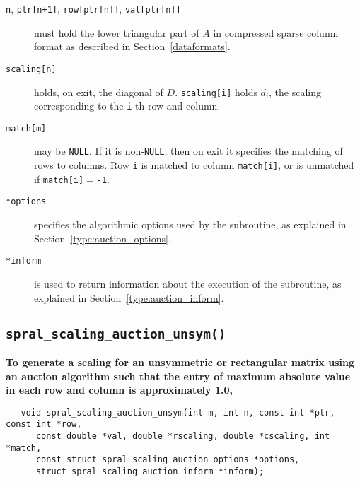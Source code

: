 \begin{description}

\item[\texttt{n}, \texttt{ptr[n+1]}, \texttt{row[ptr[n]]}, \texttt{val[ptr[n]]}] must hold the lower triangular part of $A$ in compressed sparse column format as described in Section~\ref{dataformats}.

\item[\texttt{scaling[n]}] holds, on exit, the diagonal of $D$.
\texttt{scaling[i]} holds $d_i$, the scaling corresponding to the
\texttt{i}-th row and column.

\item[\texttt{match[m]}] may be \texttt{NULL}. If it is non-\texttt{NULL},
then on exit it specifies the matching of rows to columns.
Row \texttt{i} is matched to column \texttt{match[i]}, or is unmatched
if \texttt{match[i]}$=$\texttt{-1}.

\item[\texttt{*options}] specifies the algorithmic options used by the subroutine, as explained in Section~\ref{type:auction_options}.

\item[\texttt{*inform}] is used to return information about the execution of the subroutine, as explained in Section~\ref{type:auction_inform}.


\end{description}

\subsection{\texttt{spral\_scaling\_auction\_unsym()}}

\textbf{\noindent
   To generate a scaling for an unsymmetric or rectangular matrix using an auction algorithm such that the entry of maximum absolute value in each row and column is approximately 1.0,
}
\vspace*{-0.1cm}
\begin{verbatim}
   void spral_scaling_auction_unsym(int m, int n, const int *ptr, const int *row,
      const double *val, double *rscaling, double *cscaling, int *match,
      const struct spral_scaling_auction_options *options,
      struct spral_scaling_auction_inform *inform);
\end{verbatim}

